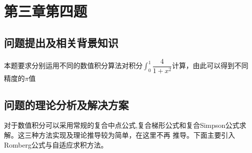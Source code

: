 \documentclass{ctexart}
\begin{document}
\section{第三章第四题}
\subsection{问题提出及相关背景知识}
本题要求分别运用不同的数值积分算法对积分$\int_{0}^{1}\dfrac{4}{1+x^2}$计算，由此可以得到不同精度的$\pi$值
\subsection{问题的理论分析及解决方案}
对于数值积分可以采用常规的复合中点公式,复合梯形公式和复合Simpson公式求解。这三种方法实现及理论推导较为简单，在这里不再
推导。下面主要引入Romberg公式与自适应求积方法。
\end{document}
